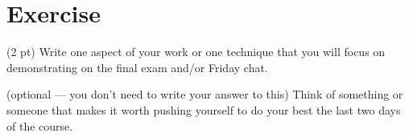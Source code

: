 %
%
\section{Exercise}

(2 pt) Write one aspect of your work or one technique that you will focus on demonstrating on the final exam and/or Friday chat.

\spaceSolution{2in}{}

\noindent(optional --- you don't need to write your answer to this) Think of something or someone that makes it worth pushing yourself to do your best the last two days of the course.